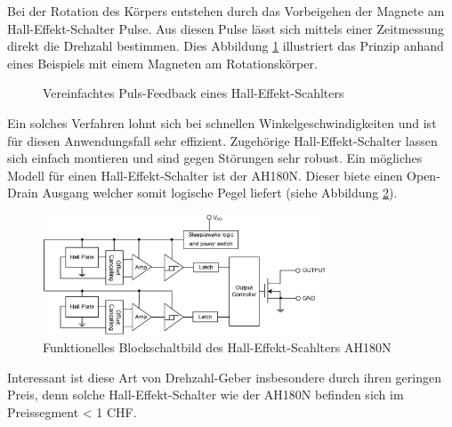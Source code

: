Bei der Rotation des Körpers entstehen durch das Vorbeigehen der Magnete
am Hall-Effekt-Schalter Pulse. Aus diesen Pulse lässt sich mittels einer
Zeitmessung direkt die Drehzahl bestimmen. Dies Abbildung 
\ref{fig:hall-effekt-schalter} illustriert das Prinzip anhand eines
Beispiels mit einem Magneten am Rotationskörper.

\begin{figure}[h!]
	\centering
	\caption{Vereinfachtes Puls-Feedback eines Hall-Effekt-Scahlters}
	\label{fig:hall-effekt-schalter}
\end{figure}

Ein solches Verfahren lohnt sich bei schnellen Winkelgeschwindigkeiten
und ist für diesen Anwendungsfall sehr effizient. Zugehörige
Hall-Effekt-Schalter lassen sich einfach montieren und sind gegen Störungen
sehr robust. Ein mögliches Modell für einen Hall-Effekt-Schalter ist der
AH180N. Dieser biete einen Open-Drain Ausgang welcher somit logische Pegel
liefert (siehe Abbildung \ref{fig:AH180N_functional}).

\begin{figure}[h!]
	\centering
	\includegraphics[width=0.75\textwidth]{../src/Bilder/AH180N_functional.png}
	\caption{Funktionelles Blockschaltbild des Hall-Effekt-Scahlters AH180N}
	\label{fig:AH180N_functional}
\end{figure}

Interessant ist diese Art von Drehzahl-Geber insbesondere durch ihren
geringen Preis, denn solche Hall-Effekt-Schalter wie der AH180N befinden
sich im Preissegment < 1 CHF.
